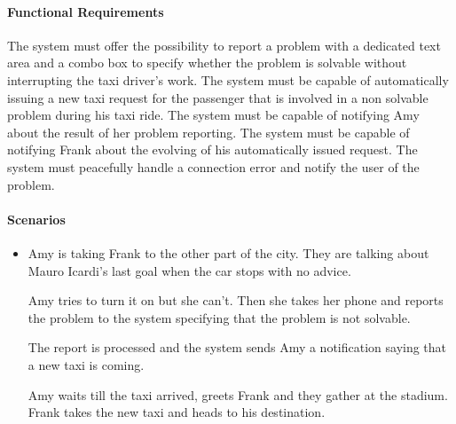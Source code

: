 \paragraph{Functional Requirements}
\begin{itemize}
	 The system must offer the possibility to report a problem with a dedicated text area and a combo box to specify whether the problem is solvable without interrupting the taxi driver's work.
	 The system must be capable of automatically issuing a new taxi request for the passenger that is involved in a non solvable problem during his taxi ride.
	 The system must be capable of notifying Amy about the result of her problem reporting.
	 The system must be capable of notifying Frank about the evolving of his automatically issued request.
	 The system must peacefully handle a connection error and notify the user of the problem.
\end{itemize} 
\paragraph{Scenarios}
\begin{itemize}
	\item Amy is taking Frank to the other part of the city. They are talking about Mauro Icardi's last goal when the car stops with no advice. \par Amy tries to turn it on but she can't. Then she takes her phone and reports the problem to the system specifying that the problem is not solvable. \par The report is processed and the system sends Amy a notification saying that a new taxi is coming. \par Amy waits till the taxi arrived, greets Frank and they gather at the stadium. Frank takes the new taxi and heads to his destination.
\end{itemize}
